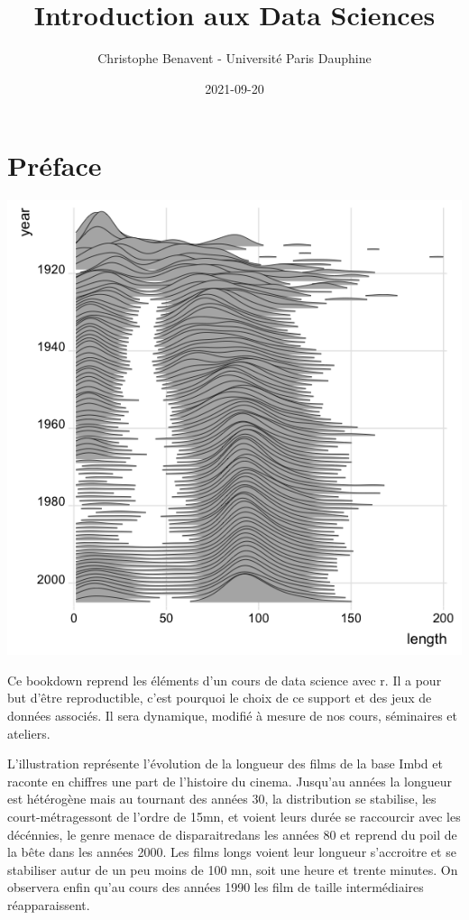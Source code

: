 \documentclass[
]{book}
\title{Introduction aux Data Sciences}
\author{Christophe Benavent - Université Paris Dauphine}
\date{2021-09-20}
\begin{document}
\maketitle

{
\setcounter{tocdepth}{1}
\tableofcontents
}
\hypertarget{pruxe9face}{%
\chapter{Préface}\label{pruxe9face}}

\includegraphics{./Images/ggridge.png}

Ce bookdown reprend les éléments d'un cours de data science avec r. Il a pour but d'être reproductible, c'est pourquoi le choix de ce support et des jeux de données associés. Il sera dynamique, modifié à mesure de nos cours, séminaires et ateliers.

L'illustration représente l'évolution de la longueur des films de la base Imbd et raconte en chiffres une part de l'histoire du cinema. Jusqu'au années la longueur est hétérogène mais au tournant des années 30, la distribution se stabilise, les court-métragessont de l'ordre de 15mn, et voient leurs durée se raccourcir avec les décénnies, le genre menace de disparaitredans les années 80 et reprend du poil de la bête dans les années 2000. Les films longs voient leur longueur s'accroitre et se stabiliser autur de un peu moins de 100 mn, soit une heure et trente minutes. On observera enfin qu'au cours des années 1990 les film de taille intermédiaires réapparaissent.
\end{document}

